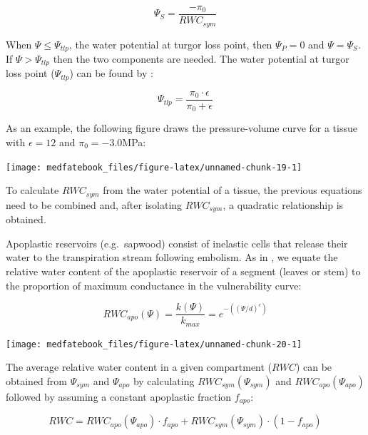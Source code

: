 \documentclass[]{book}
\begin{document}
\begin{equation}
\Psi_{S} = \frac{-\pi_0}{RWC_{sym}} 
\end{equation}

When \(\Psi \leq \Psi_{tlp}\), the water potential at turgor loss point,
then \(\Psi_{P} = 0\) and \(\Psi = \Psi_{S}\). If \(\Psi > \Psi_{tlp}\)
then the two components are needed. The water potential at turgor loss
point (\(\Psi_{tlp}\)) can be found by \citep{Bartlett2012}:

\begin{equation}
\Psi_{tlp} = \frac{\pi_0 \cdot \epsilon}{\pi_0 + \epsilon}
\end{equation}

As an example, the following figure draws the pressure-volume curve for
a tissue with \(\epsilon = 12\) and \(\pi_0 = -3.0\)MPa:

\begin{center}\texttt{[image: medfatebook\_files/figure-latex/unnamed-chunk-19-1]} \end{center}

To calculate \(RWC_{sym}\) from the water potential of a tissue, the
previous equations need to be combined and, after isolating
\(RWC_{sym}\), a quadratic relationship is obtained.

Apoplastic reservoirs (e.g.~sapwood) consist of inelastic cells that
release their water to the transpiration stream following embolism. As
in \citet{Holtta2009}, we equate the relative water content of the
apoplastic reservoir of a segment (leaves or stem) to the proportion of
maximum conductance in the vulnerability curve:

\begin{equation}
RWC_{apo}(\Psi) = \frac{k(\Psi)}{k_{max}} = e^{-((\Psi/d)^{c})}
\end{equation}

\begin{center}\texttt{[image: medfatebook\_files/figure-latex/unnamed-chunk-20-1]} \end{center}

The average relative water content in a given compartment (\(RWC\)) can
be obtained from \(\Psi_{sym}\) and \(\Psi_{apo}\) by calculating
\(RWC_{sym}(\Psi_{sym})\) and \(RWC_{apo}(\Psi_{apo})\) followed by
assuming a constant apoplastic fraction \(f_{apo}\):

\begin{equation}
RWC = RWC_{apo}(\Psi_{apo}) \cdot f_{apo} + RWC_{sym}(\Psi_{sym}) \cdot (1 - f_{apo})
\end{equation}
\end{document}
